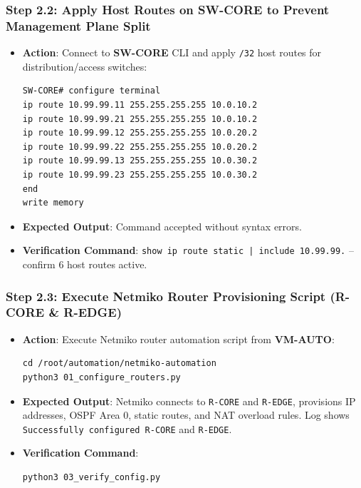 \documentclass[11pt,a4paper]{article}
\newcommand{\hr}{\vspace{0.2cm}\noindent\hrulefill\vspace{0.2cm}}
\begin{document}
\subsubsection{Step 2.2: Apply Host Routes on SW-CORE to Prevent Management Plane Split}
\begin{itemize}
    \item \textbf{Action}: Connect to \textbf{SW-CORE} CLI and apply \texttt{/32} host routes for distribution/access switches:
\begin{lstlisting}[style=ciscostyle]
SW-CORE# configure terminal
ip route 10.99.99.11 255.255.255.255 10.0.10.2
ip route 10.99.99.21 255.255.255.255 10.0.10.2
ip route 10.99.99.12 255.255.255.255 10.0.20.2
ip route 10.99.99.22 255.255.255.255 10.0.20.2
ip route 10.99.99.13 255.255.255.255 10.0.30.2
ip route 10.99.99.23 255.255.255.255 10.0.30.2
end
write memory
\end{lstlisting}
    \item \textbf{Expected Output}: Command accepted without syntax errors.
    \item \textbf{Verification Command}: \texttt{show ip route static | include 10.99.99.} -- confirm 6 host routes active.
\end{itemize}

\subsubsection{Step 2.3: Execute Netmiko Router Provisioning Script (R-CORE \& R-EDGE)}
\begin{itemize}
    \item \textbf{Action}: Execute Netmiko router automation script from \textbf{VM-AUTO}:
\begin{lstlisting}[style=bashstyle]
cd /root/automation/netmiko-automation
python3 01_configure_routers.py
\end{lstlisting}
    \item \textbf{Expected Output}: Netmiko connects to \texttt{R-CORE} and \texttt{R-EDGE}, provisions IP addresses, OSPF Area 0, static routes, and NAT overload rules. Log shows \texttt{Successfully configured R-CORE} and \texttt{R-EDGE}.
    \item \textbf{Verification Command}:
\begin{lstlisting}[style=bashstyle]
python3 03_verify_config.py
\end{lstlisting}
\end{itemize}

\hr
\end{document}

